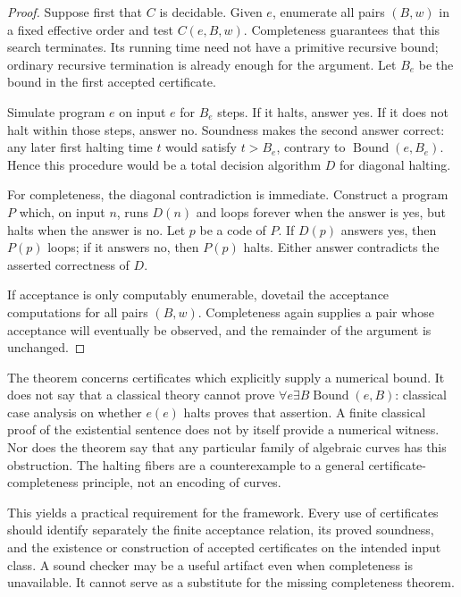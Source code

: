 \begin{proof}
Suppose first that $C$ is decidable. Given $e$, enumerate all pairs
$(B,w)$ in a fixed effective order and test $C(e,B,w)$. Completeness
guarantees that this search terminates. Its running time need not have
a primitive recursive bound; ordinary recursive termination is already
enough for the argument. Let $B_e$ be the bound in the first accepted
certificate.

Simulate program $e$ on input $e$ for $B_e$ steps. If it halts, answer
yes. If it does not halt within those steps, answer no. Soundness makes
the second answer correct: any later first halting time $t$ would satisfy
$t>B_e$, contrary to $\operatorname{Bound}(e,B_e)$. Hence this procedure
would be a total decision algorithm $D$ for diagonal halting.

For completeness, the diagonal contradiction is immediate. Construct a
program $P$ which, on input $n$, runs $D(n)$ and loops forever when the
answer is yes, but halts when the answer is no. Let $p$ be a code of $P$.
If $D(p)$ answers yes, then $P(p)$ loops; if it answers no, then $P(p)$
halts. Either answer contradicts the asserted correctness of $D$.

If acceptance is only computably enumerable, dovetail the acceptance
computations for all pairs $(B,w)$. Completeness again supplies a pair
whose acceptance will eventually be observed, and the remainder of the
argument is unchanged.
\end{proof}

The theorem concerns certificates which explicitly supply a numerical
bound. It does not say that a classical theory cannot prove
$\forall e\exists B\operatorname{Bound}(e,B)$: classical case analysis
on whether $e(e)$ halts proves that assertion. A finite classical proof
of the existential sentence does not by itself provide a numerical
witness. Nor does the theorem say that any particular family of
algebraic curves has this obstruction. The halting fibers are a
counterexample to a general certificate-completeness principle, not
an encoding of curves.

This yields a practical requirement for the framework. Every use of
certificates should identify separately the finite acceptance relation,
its proved soundness, and the existence or construction of accepted
certificates on the intended input class. A sound checker may be a useful
artifact even when completeness is unavailable. It cannot serve as a
substitute for the missing completeness theorem.

